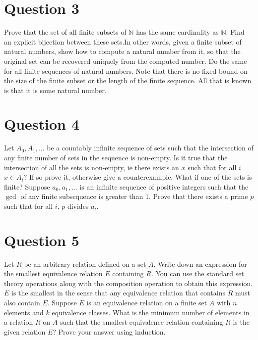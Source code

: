 \documentclass[12pt]{report}
\begin{document}
\section*{Question 3}
Prove that the set of all finite subsets of $\mathbb{N}$ has the same cardinality as $\mathbb{N}$. Find an explicit bijection between these sets.In other words, given a finite subset of natural numbers, show how to compute a natural number from it, so that the original set can be
recovered uniquely from the computed number. Do the same for all finite sequences of natural numbers. Note that there is no fixed bound on the size of the finite subset or the length of the finite sequence. All that is known is that it is some natural number.
\section*{Question 4}
Let $A_{0}, A_{1}, \dots$ be a countably infinite sequence of sets such that the intersection of any finite number of sets in the sequence is non-empty. Is it true that the intersection of all the sets is non-empty, ie there exists an $x$ such that for all $i$ $x \in A_{i}$? If so prove it, otherwise give a counterexample. What if one of the sets is finite? Suppose $a_{0}, a_{1}, \dots$ is an infinite sequence of positive integers such that the $\gcd$ of any finite subsequence is greater than 1. Prove that there exists a prime $p$ such that for all $i$, $p$ divides $a_{i}$.
\section*{Question 5}
Let $R$ be an arbitrary relation defined on a set $A$. Write down an expression for the smallest equivalence relation $E$ containing $R$. You can use the standard set theory operations along with the composition operation to obtain this expression. $E$ is the smallest in the sense that any equivalence relation that contains $R$ must also contain $E$. Suppose $E$ is an equivalence relation on a finite set $A$ with $n$ elements and $k$ equivalence classes. What is the minimum number of elements in a relation $R$ on $A$ such that the smallest equivalence relation containing $R$ is the given relation $E$? Prove your answer using induction.
\end{document}
